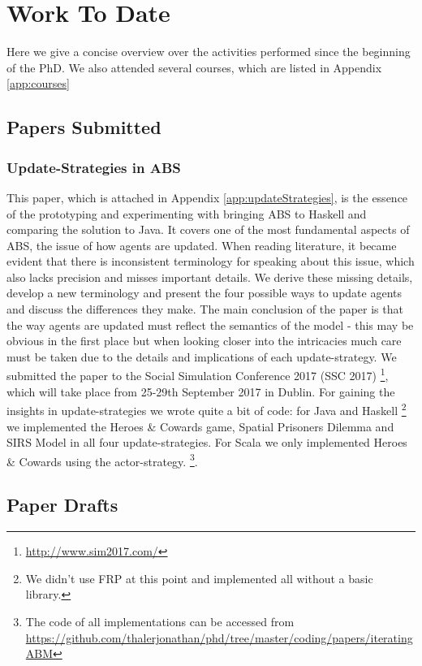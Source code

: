\chapter{Work To Date}
\label{chap:work}

Here we give a concise overview over the activities performed since the beginning of the PhD. We also attended several courses, which are listed in Appendix \ref{app:courses}

\section{Papers Submitted}
\subsection{Update-Strategies in ABS}
This paper, which is attached in Appendix \ref{app:updateStrategies}, is the essence of the prototyping and experimenting with bringing ABS to Haskell and comparing the solution to Java. It covers one of the most fundamental aspects of ABS, the issue of how agents are updated. When reading literature, it became evident that there is inconsistent terminology for speaking about this issue, which also lacks precision and misses important details. We derive these missing details, develop a new terminology and present the four possible ways to update agents and discuss the differences they make. The main conclusion of the paper is that the way agents are updated must reflect the semantics of the model - this may be obvious in the first place but when looking closer into the intricacies  much care must be taken due to the details and implications of each update-strategy.
We submitted the paper to the Social Simulation Conference 2017 (SSC 2017) \footnote{\url{http://www.sim2017.com/}}, which will take place from 25-29th September 2017 in Dublin.
For gaining the insights in update-strategies we wrote quite a bit of code: for Java and Haskell \footnote{We didn't use FRP at this point and implemented all without a basic library.} we implemented the Heroes \& Cowards game, Spatial Prisoners Dilemma and SIRS Model in all four update-strategies. For Scala we only implemented Heroes \& Cowards using the actor-strategy.
\footnote{The code of all implementations can be accessed from \url{https://github.com/thalerjonathan/phd/tree/master/coding/papers/iteratingABM}}. 

\section{Paper Drafts}
